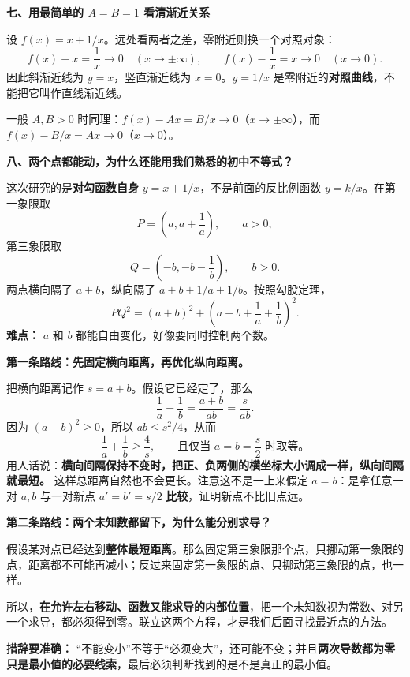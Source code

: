\clearpage
\begin{explanationbox}
\textbf{七、用最简单的 $A=B=1$ 看清渐近关系}

设 $f(x)=x+1/x$。远处看两者之差，零附近则换一个对照对象：
\[
 f(x)-x=\frac1x\longrightarrow0\quad(x\to\pm\infty),
 \qquad f(x)-\frac1x=x\longrightarrow0\quad(x\to0).
\]
因此斜渐近线为 $y=x$，竖直渐近线为 $x=0$。$y=1/x$ 是零附近的\textbf{对照曲线}，不能把它叫作直线渐近线。

一般 $A,B>0$ 时同理：$f(x)-Ax=B/x\to0$（$x\to\pm\infty$），而 $f(x)-B/x=Ax\to0$（$x\to0$）。
\end{explanationbox}


\clearpage
\begin{explanationbox}
\textbf{八、两个点都能动，为什么还能用我们熟悉的初中不等式？}

这次研究的是\textbf{对勾函数自身} $y=x+1/x$，不是前面的反比例函数 $y=k/x$。在第一象限取
\[
P=\left(a,a+\frac1a\right),\qquad a>0,
\]
第三象限取
\[
Q=\left(-b,-b-\frac1b\right),\qquad b>0.
\]
两点横向隔了 $a+b$，纵向隔了 $a+b+1/a+1/b$。按照勾股定理，
\[
PQ^2=(a+b)^2+\left(a+b+\frac1a+\frac1b\right)^2.
\]
\textbf{难点：} $a$ 和 $b$ 都能自由变化，好像要同时控制两个数。

\medskip
\textbf{第一条路线：先固定横向距离，再优化纵向距离。}

把横向距离记作 $s=a+b$。假设它已经定了，那么
\[
\frac1a+\frac1b=\frac{a+b}{ab}=\frac{s}{ab}.
\]
因为 $(a-b)^2\ge0$，所以 $ab\le s^2/4$，从而
\[
\boxed{\frac1a+\frac1b\ge\frac4s},\qquad
\text{且仅当 }a=b=\frac s2\text{ 时取等。}
\]
用人话说：\textbf{横向间隔保持不变时，把正、负两侧的横坐标大小调成一样，纵向间隔就最短。} 这样总距离自然也不会更长。注意这不是一上来假定 $a=b$：是拿任意一对 $a,b$ 与一对新点 $a'=b'=s/2$ \textbf{比较}，证明新点不比旧点远。

\medskip
\textbf{第二条路线：两个未知数都留下，为什么能分别求导？}

假设某对点已经达到\textbf{整体最短距离}。那么固定第三象限那个点，只挪动第一象限的点，距离都不可能再减小；反过来固定第一象限的点、只挪动第三象限的点，也一样。

所以，\textbf{在允许左右移动、函数又能求导的内部位置}，把一个未知数视为常数、对另一个求导，都必须得到零。联立这两个方程，才是我们后面寻找最近点的方法。

\textbf{措辞要准确：} “不能变小”不等于“必须变大”，还可能不变；并且\textbf{两次导数都为零只是最小值的必要线索}，最后必须判断找到的是不是真正的最小值。
\end{explanationbox}
